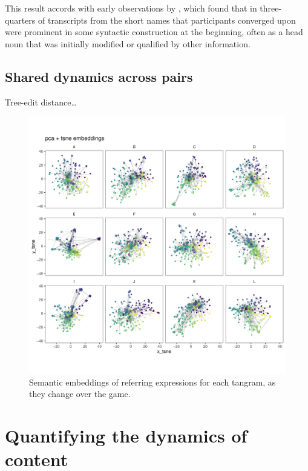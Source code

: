 \documentclass[alpha-refs]{wiley-article}
\begin{document}
This result accords with early observations by \cite{Carroll80_NamingHedges}, which found that in three-quarters of transcripts from \cite{KraussWeinheimer64_ReferencePhrases} the short names that participants converged upon were prominent in some syntactic construction at the beginning, often as a head noun that was initially modified or qualified by other information. 

\subsection{Shared dynamics across pairs}

Tree-edit distance\dots

\begin{figure}[t]
\centering
\includegraphics[scale=.3]{tsne_embeddings.pdf}
\caption{Semantic embeddings of referring expressions for each tangram, as they change over the game. }
\label{fig:reduction}
\end{figure}

\section{Quantifying the dynamics of content}
\end{document}
